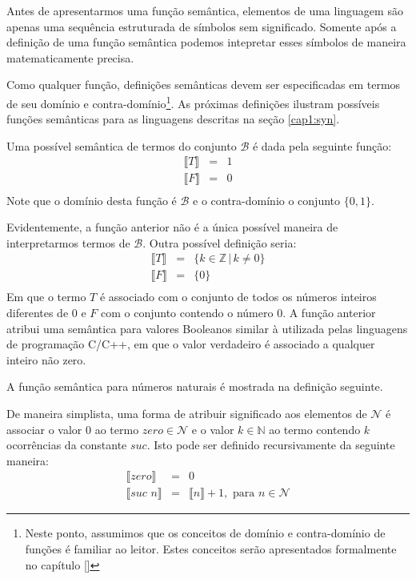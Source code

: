 Antes de apresentarmos uma fun\c{c}\~ao sem\^antica, elementos de uma linguagem s\~ao apenas uma sequ\^encia estruturada de s\'imbolos
sem significado. Somente ap\'os a defini\c{c}\~ao de uma fun\c{c}\~ao sem\^antica podemos intepretar esses s\'imbolos de maneira 
matematicamente precisa.

Como qualquer fun\c{c}\~ao, defini\c{c}\~oes sem\^anticas devem ser especificadas em termos de seu dom\'inio e 
contra-dom\'inio\footnote{Neste ponto, assumimos que os conceitos de dom\'inio e contra-dom\'inio de fun\c{c}\~oes \'e familiar ao leitor.
Estes conceitos ser\~ao apresentados formalmente no cap\'itulo \ref{}}. As pr\'oximas defini\c{c}\~oes ilustram poss\'iveis fun\c{c}\~oes 
sem\^anticas para as linguagens descritas na se\c{c}\~ao \ref{cap1:syn}.

\begin{Definition}
Uma poss\'ivel sem\^antica de termos do conjunto $\mathcal{B}$ \'e dada pela seguinte fun\c{c}\~ao:
\[
\begin{array}{lcl}
\llbracket T \rrbracket & = & 1\\
\llbracket F \rrbracket & = & 0\\
\end{array}
\]
Note que o dom\'inio desta fun\c{c}\~ao \'e $\mathcal{B}$ e o contra-dom\'inio o conjunto $\{0,1\}$.
\end{Definition}
Evidentemente, a fun\c{c}\~ao anterior n\~ao \'e a \'unica poss\'ivel maneira de interpretarmos termos de $\mathcal{B}$.
Outra poss\'ivel defini\c{c}\~ao seria:
\[
\begin{array}{lcl}
\llbracket T \rrbracket & = & \{k\in\mathbb{Z}\,|\,k\neq 0\}\\
\llbracket F \rrbracket & = & \{0\}\\
\end{array}
\]
Em que o termo $T$ \'e associado com o conjunto de todos os n\'umeros inteiros diferentes de $0$ e $F$ com o conjunto contendo 
o n\'umero $0$. A fun\c{c}\~ao anterior atribui uma sem\^antica para valores Booleanos similar \`a utilizada pelas linguagens 
de programa\c{c}\~ao C/C++, em que o valor verdadeiro \'e associado a qualquer inteiro n\~ao zero.

A fun\c{c}\~ao sem\^antica para n\'umeros naturais \'e mostrada na defini\c{c}\~ao seguinte.

\begin{Definition}
De maneira simplista, uma forma de atribuir significado aos elementos de $\mathcal{N}$ \'e associar o valor $0$ ao termo $zero\in\mathcal{N}$
e o valor $k\in\mathbb{N}$ ao termo contendo $k$ ocorr\^encias da constante $suc$. Isto pode ser definido recursivamente da seguinte maneira:
\[
\begin{array}{lcl}
\llbracket zero \rrbracket & = & 0\\
\llbracket suc\,\,n\rrbracket & = & \llbracket n \rrbracket + 1, \text{ para }n\in\mathcal{N}
\end{array}
\]
\end{Definition}

